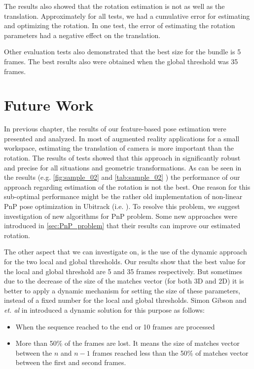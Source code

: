The results also showed that the rotation estimation is not as well as the translation. Approximately for all tests, we had a cumulative error for estimating and optimizing the rotation. In one test, the error of estimating the rotation parameters had a negative effect on the translation.

Other evaluation tests also demonstrated that the best size for the bundle is 5 frames. The best results also were obtained when the global threshold was 35 frames. 

\section{Future Work}
In previous chapter, the results of our feature-based pose estimation were presented and analyzed. In most of augmented reality applications for a small workspace, estimating the translation of camera is more important than the rotation. The results of tests showed that this approach in significantly robust and precise for all situations and geometric transformations. As can be seen in the results (e.g. \autoref{fig:sample_02} and \autoref{tab:sample_02} ) the performance of our approach regarding estimation of the rotation is not the best. One reason for this sub-optimal performance might be the rather old implementation of non-linear PnP pose optimization in Ubitrack (i.e. \cite{lu2000fast}). To resolve this problem, we suggest investigation of new algorithms for PnP problem. Some new approaches were introduced in \autoref{sec:PnP_problem} that their results can improve our estimated rotation.

The other aspect that we can investigate on, is the use of the dynamic approach for the two local and global thresholds. Our results show that the best value for the local and global threshold are 5 and 35 frames respectively. But sometimes due to the decrease of the size of the matches vector (for both 3D and 2D) it is better to apply a dynamic mechanism for setting the size of these parameters, instead of a fixed number for the local and global thresholds. Simon Gibson and \textit{et. al} in \cite{gibson2002accurate} introduced a dynamic solution for this purpose as follows:
\begin{itemize}
\item When the sequence reached to the end or 10 frames are processed
\item More than 50\% of the frames are lost. It means the size of matches vector between the $n$ and $n-1$ frames reached less than the 50\% of matches vector between the first and second frames.
\end{itemize}
